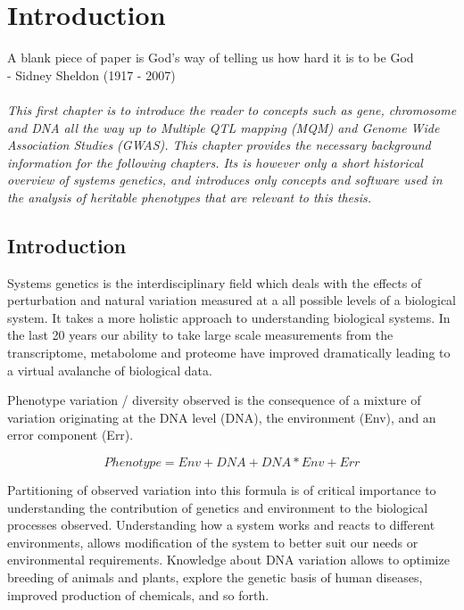 \chapter{Introduction}
\thispagestyle{empty}
\label{chap:introduction}
A blank piece of paper is God's way of telling us how hard it is to be God\\
- Sidney Sheldon (1917 - 2007)\\\\

\emph{This first chapter is to introduce the reader to concepts such as gene, chromosome 
and DNA all the way up to Multiple QTL mapping (MQM) and Genome Wide Association Studies 
(GWAS). This chapter provides the necessary background information for the following 
chapters. Its is however only a short historical overview of systems genetics, and 
introduces only concepts and software used in the analysis of heritable phenotypes that 
are relevant to this thesis. }

\null
\vfill
\newpage

\section{Introduction}
Systems genetics is the interdisciplinary field which deals with the effects of perturbation 
and natural variation measured at a all possible levels of a biological system. It takes a 
more holistic approach to understanding biological systems. In the last 20 years our ability 
to take large scale measurements from the transcriptome, metabolome and proteome have 
improved dramatically leading to a virtual avalanche of biological data.

Phenotype variation / diversity observed is the consequence of a mixture of variation 
originating at the DNA level (DNA), the environment (Env), and an error component (Err).

$$ Phenotype = Env + DNA + DNA * Env + Err $$

Partitioning of observed variation into this formula is of critical importance 
to understanding the contribution of genetics and environment to the biological 
processes observed. Understanding how a system works and reacts to different 
environments, allows modification of the system to better suit our needs or 
environmental requirements. Knowledge about DNA variation allows to optimize 
breeding of animals and plants, explore the genetic basis of human diseases, 
improved production of chemicals, and so forth.

